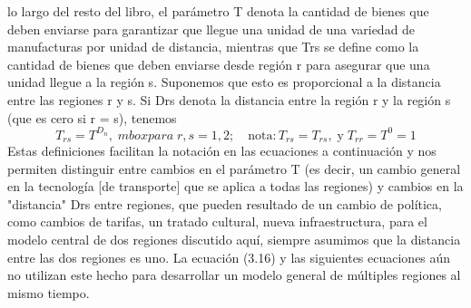  lo largo del resto del libro, el parámetro T denota la cantidad de bienes que deben enviarse para garantizar que llegue una unidad de una variedad de manufacturas por unidad de distancia, mientras que Trs se define como la cantidad de bienes que deben enviarse desde región r para asegurar que una unidad llegue a la región s. Suponemos que esto es proporcional a la distancia entre las regiones r y s. Si Drs denota la distancia entre la región r y la región s (que es cero si r = s), tenemos
 $$T_{rs} = T^{D_n}, \; mbox{para}\; r,s=1,2;\quad \mbox{nota}: T_{rs}=T_{rs}, \; \mbox{y} \; T_{rr}=T^0=1$$
 Estas definiciones facilitan la notación en las ecuaciones a continuación y nos permiten distinguir entre cambios en el parámetro T (es decir, un cambio general en la tecnología [de transporte] que se aplica a todas las regiones) y cambios en la "distancia" Drs entre regiones, que pueden resultado de un cambio de política, como cambios de tarifas, un tratado cultural, nueva infraestructura, para el  modelo central de dos regiones discutido aquí, siempre asumimos que la distancia entre las dos regiones es uno. La ecuación (3.16) y las siguientes ecuaciones aún no utilizan este hecho para desarrollar un modelo general de múltiples regiones al mismo tiempo. 

